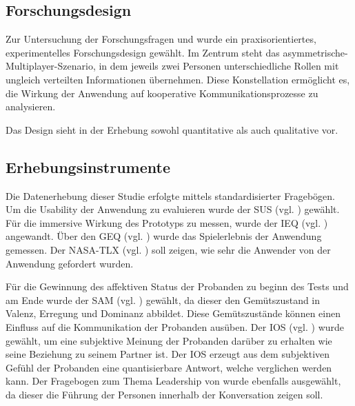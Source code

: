 \subsection{Forschungsdesign}
Zur Untersuchung der Forschungsfragen  und  wurde ein praxisorientiertes, experimentelles Forschungsdesign gewählt. Im Zentrum steht das asymmetrische-Multiplayer-Szenario, in dem jeweils zwei Personen unterschiedliche Rollen mit ungleich verteilten Informationen übernehmen. Diese Konstellation ermöglicht es, die Wirkung der Anwendung auf kooperative Kommunikationsprozesse zu analysieren.

Das Design sieht in der Erhebung sowohl quantitative als auch qualitative vor. 

\subsection{Erhebungsinstrumente}

Die Datenerhebung dieser Studie erfolgte mittels standardisierter Fragebögen.
Um die Usability der Anwendung zu evaluieren wurde der \ac{SUS} (vgl. \cite{brooke_sus_1995}) gewählt. Für die immersive Wirkung des Prototyps zu messen, wurde der \ac{IEQ} (vgl. \cite{jennett_measuring_2008}) angewandt. Über den \ac{GEQ} (vgl. \cite{ijsselsteijn_game_2013}) wurde das Spielerlebnis der Anwendung gemessen. Der \ac{NASA-TLX} (vgl. \cite{hart_nasa-task_2006}) soll zeigen, wie sehr die Anwender von der Anwendung gefordert wurden.

Für die Gewinnung des affektiven Status der Probanden zu beginn des Tests und am Ende wurde der \ac{SAM} (vgl. \cite{russell_evidence_1977}) gewählt, da dieser den Gemütszustand in Valenz, Erregung und Dominanz abbildet. Diese Gemütszustände können einen Einfluss auf die Kommunikation der Probanden ausüben. Der \ac{IOS} (vgl. \cite{gachter_measuring_2015}) wurde gewählt, um eine subjektive Meinung der Probanden darüber zu erhalten wie seine Beziehung zu seinem Partner ist. Der \ac{IOS} erzeugt aus dem subjektiven Gefühl der Probanden eine quantisierbare Antwort, welche verglichen werden kann. Der Fragebogen zum Thema Leadership von \cite{emmerich_game_2016} wurde ebenfalls ausgewählt, da dieser die Führung der Personen innerhalb der Konversation zeigen soll.

